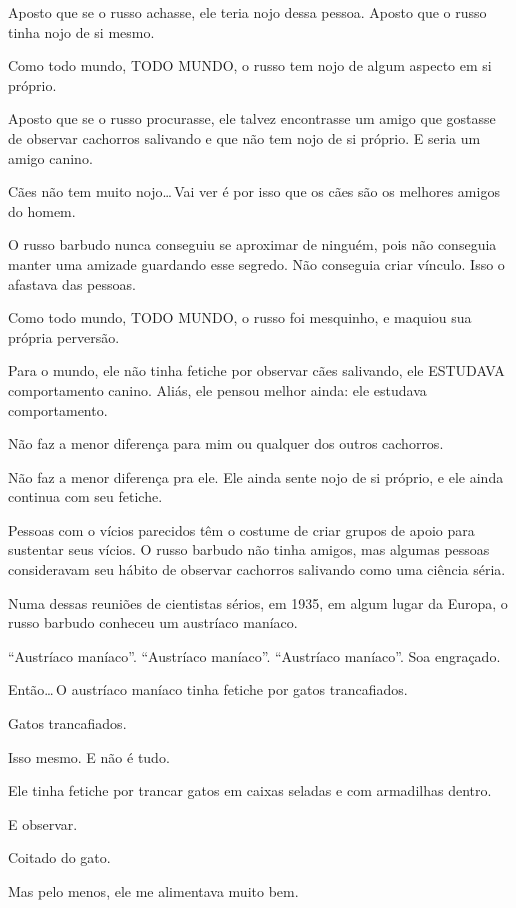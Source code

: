 Aposto que se o russo achasse, ele teria nojo dessa pessoa. Aposto que o russo tinha nojo de si mesmo.

Como todo mundo, TODO MUNDO, o russo tem nojo de algum aspecto em si próprio.

Aposto que se o russo procurasse, ele talvez encontrasse um amigo que gostasse de observar cachorros salivando e que não tem nojo de si próprio. E seria um amigo canino.

Cães não tem muito nojo\ldots\,Vai ver é por isso que os cães são os melhores amigos do homem.

O russo barbudo nunca conseguiu se aproximar de ninguém, pois não conseguia manter uma amizade guardando esse segredo. Não conseguia criar vínculo. Isso o afastava das pessoas.

Como todo mundo, TODO MUNDO, o russo foi mesquinho, e maquiou sua própria perversão.

\begin{sloppypar}
Para o mundo, ele não tinha fetiche por observar cães salivando, ele ESTUDAVA comportamento canino. Aliás, ele pensou melhor ainda: ele estudava comportamento.
\end{sloppypar}

Não faz a menor diferença para mim ou qualquer dos outros cachorros.

Não faz a menor diferença pra ele. Ele ainda sente nojo de si próprio, e ele ainda continua com seu fetiche.

Pessoas com o vícios parecidos têm o costume de criar grupos de apoio para sustentar seus vícios. O russo barbudo não tinha amigos, mas algumas pessoas consideravam seu hábito de observar cachorros salivando como uma ciência séria.

Numa dessas reuniões de cientistas sérios, em 1935, em algum lugar da Europa, o russo barbudo conheceu um austríaco maníaco.

\sloppy
``Austríaco maníaco''. ``Austríaco maníaco''. ``Austríaco maníaco''. Soa engraçado.

Então\ldots\,O austríaco maníaco tinha fetiche por gatos trancafiados.

\fussy
Gatos trancafiados.

Isso mesmo. E não é tudo.

Ele tinha fetiche por trancar gatos em caixas seladas e com armadilhas dentro.

E observar.

Coitado do gato.

Mas pelo menos, ele me alimentava muito bem.

